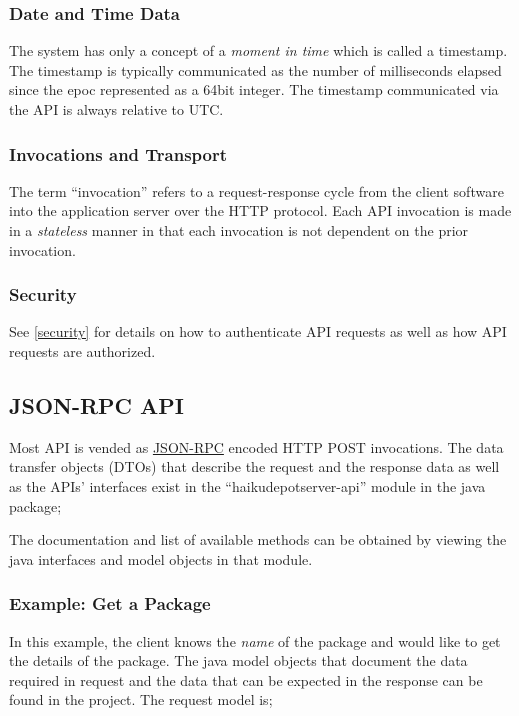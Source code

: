 \subsubsection{Date and Time Data}

The system has only a concept of a {\it moment in time} which is called a timestamp.  The timestamp is typically communicated as the number of milliseconds elapsed since the epoc represented as a 64bit integer.  The timestamp communicated via the API is always relative to UTC.

\subsubsection{Invocations and Transport}

The term ``invocation'' refers to a request-response cycle from the client software into the application server over the HTTP protocol.  Each API invocation is made in a {\it stateless} manner in that each invocation is not dependent on the prior invocation.

\subsubsection{Security}

See \ref{security} for details on how to authenticate API requests as well as how API requests are authorized.

\subsection{JSON-RPC API}

Most API is vended as \href{http://www.jsonrpc.org}{JSON-RPC} encoded HTTP POST invocations.  The data transfer objects (DTOs) that describe the request and the response data as well as the APIs' interfaces exist in the ``haikudepotserver-api'' module in the java package;


The documentation and list of available methods can be obtained by viewing the java interfaces and model objects in that module.

\subsubsection{Example: Get a Package}

In this example, the client knows the {\it name} of the package and would like to get the details of the package.  The java model objects that document the data required in request and the data that can be expected in the response can be found in the project.  The request model is;

